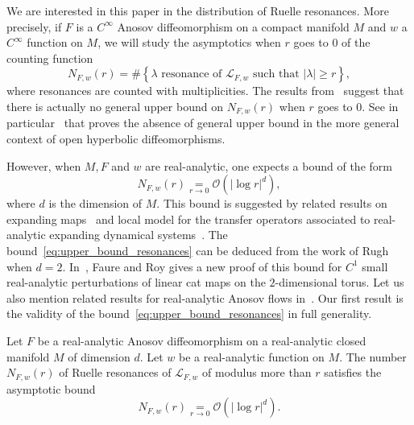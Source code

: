 \documentclass[AHL,Unicode,longabstracts,published]{cedram}
\newcommand{\set}[1]{\left\{ #1 \right\}}
\newcommand{\p}[1]{\left(#1\right)}
\newcommand{\va}[1]{\left|#1\right|}
\newcommand{\clO}{\mathcal{O}}
\newcommand{\clL}{\mathcal{L}}
\newcommand{\clO}{\mathcal{O}}
\begin{document}
We are interested in this paper in the distribution of Ruelle resonances. More precisely, if $F$ is a $C^\infty$ Anosov diffeomorphism on a compact manifold $M$ and $w$ a $C^\infty$ function on $M$, we will study the asymptotics when $r$ goes to $0$ of the counting function
\begin{equation*}
N_{F,w}(r) = \# \set{ \lambda \text{ resonance of } \clL_{F,w} \text{ such that } \va{\lambda} \geq r},
\end{equation*}
where resonances are counted with multiplicities. The results from~\cite{local_and_global} suggest that there is actually no general upper bound on $N_{F,w}(r)$ when $r$ goes to $0$. See in particular~\cite[Proposition~2.10]{local_and_global} that proves the absence of general upper bound in the more general context of open hyperbolic diffeomorphisms.

However, when $M,F$ and $w$ are real-analytic, one expects a bound of the form
\begin{equation}\label{eq:upper_bound_resonances}
N_{F,w}(r) \underset{r \to 0}{=} \clO\p{\va{\log r}^d},
\end{equation}
where $d$ is the dimension of $M$. This bound is suggested by related results on expanding maps~\cite{ bandtlow_naud,ruelle_zeta_expanding} and local model for the transfer operators associated to real-analytic expanding dynamical systems~\cite{naud_local}. The bound~\eqref{eq:upper_bound_resonances} can be deduced from the work of Rugh~\cite{rugh_correlation, rugh_fredholm_axiomA} when $d=2$. In~\cite[Theorem~7]{faure_roy}, Faure and Roy gives a new proof of this bound for $C^1$ small real-analytic perturbations of linear cat maps on the $2$-dimensional torus. Let us also mention related results for real-analytic Anosov flows in~\cite{fried_selberg,fried_zeta,BJ20}. Our first result is the validity of the bound~\eqref{eq:upper_bound_resonances} in full generality.

\begin{theo}\label{theorem:upper_bound_resonances}
Let $F$ be a real-analytic Anosov diffeomorphism on a real-analytic closed manifold $M$ of dimension $d$. Let $w$ be a real-analytic function on $M$. The number $N_{F,w}(r)$ of Ruelle resonances of $\clL_{F,w}$ of modulus more than $r$ satisfies the asymptotic bound
\begin{equation*}
N_{F,w}(r) \underset{r \to 0}{=} \clO\p{\va{\log r}^d}.
\end{equation*}
\end{theo}
\end{document}
